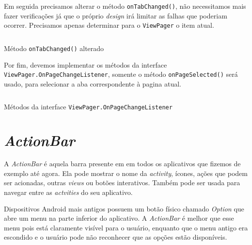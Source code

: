 \documentclass[a4paper,12pt,brazil]{book}
\begin{document}
\begin{singlespace}
	Em seguida precisamos alterar o método \texttt{onTabChanged()}, não necessitamos mais fazer verificações já que o próprio \emph{design} irá limitar as falhas que poderiam ocorrer. Precisamos apenas determinar para o \texttt{ViewPager} o item atual. 
	
	\begin{listing}[H]
	\inputminted[linenos=true,fontsize=\small,frame=lines, framesep=2mm, tabsize=2,numbersep=5pt]{java}{src/design/ontabchanged-swipe.java}
	\caption{Método \texttt{onTabChanged()} alterado}
	\end{listing}
	
	Por fim, devemos implementar os métodos da interface \texttt{ViewPager.OnPageChangeListener}, somente o método \texttt{onPageSelected()} será usado, para selecionar a aba correspondente à pagina atual.
	
	\begin{listing}[H]
	\inputminted[linenos=true,fontsize=\small,frame=lines, framesep=2mm, tabsize=2,numbersep=5pt]{java}{src/design/vpinterface.java}
	\caption{Métodos da interface \texttt{ViewPager.OnPageChangeListener}}
	\end{listing}
		
	


	
\section{\emph{ActionBar}}

	A \emph{ActionBar} é aquela barra presente em em todos os aplicativos que fizemos de exemplo até agora. Ela pode mostrar o nome da \emph{activity}, ícones, ações que podem ser acionadas, outras \emph{views} ou botões interativos. Também pode ser usada para navegar entre as \emph{actvities} do seu aplicativo.
	
	Dispositivos Android mais antigos possuem um botão físico chamado \emph{Option} que abre um menu na parte inferior do aplicativo. A \emph{ActionBar} é melhor que esse menu pois está claramente visível para o usuário, enquanto que o menu antigo era escondido e o usuário pode não reconhecer que as opções estão disponíveis.
	

\end{singlespace}
\end{document}
